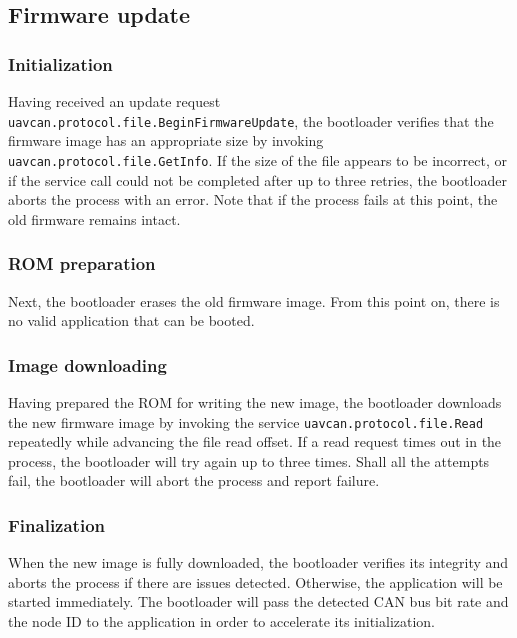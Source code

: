 \documentclass{zubaxdoc}
\begin{document}
	\subsection{Firmware update}
	
	\subsubsection{Initialization}
	
	Having received an update request \verb|uavcan.protocol.file.BeginFirmwareUpdate|,
	the bootloader verifies that the firmware image has an appropriate size by invoking
	\verb|uavcan.protocol.file.GetInfo|.
	If the size of the file appears to be incorrect,
	or if the service call could not be completed after up to three retries,
	the bootloader aborts the process with an error.
	Note that if the process fails at this point, the old firmware remains intact.
	
	\subsubsection{ROM preparation}
	
	Next, the bootloader erases the old firmware image.
	From this point on, there is no valid application that can be booted.
	
	\subsubsection{Image downloading}
	
	Having prepared the ROM for writing the new image, the bootloader downloads the new
	firmware image by invoking the service \verb|uavcan.protocol.file.Read|
	repeatedly while advancing the file read offset.
	If a read request times out in the process, the bootloader will try again up to three times.
	Shall all the attempts fail, the bootloader will abort the process and report failure.
	
	\subsubsection{Finalization}
	
	When the new image is fully downloaded, the bootloader verifies its integrity and
	aborts the process if there are issues detected.
	Otherwise, the application will be started immediately.
	The bootloader will pass the detected CAN bus bit rate and the node ID to the application
	in order to accelerate its initialization.
	
\end{document}
